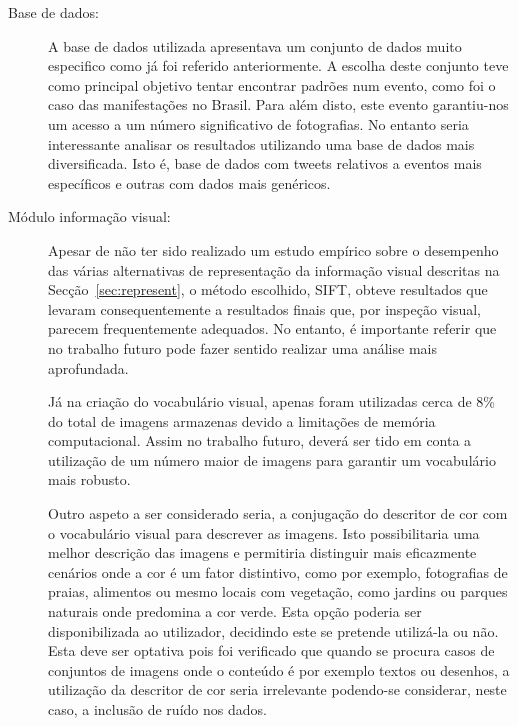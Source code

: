 \begin{description}
\item [Base de dados:] 
A base de dados utilizada apresentava um conjunto de dados muito especifico como já foi referido anteriormente. A escolha deste conjunto teve como principal objetivo tentar encontrar padrões num evento, como foi o caso das manifestações no Brasil. Para além disto, este evento garantiu-nos um acesso a um número significativo de fotografias. No entanto seria interessante analisar os resultados utilizando uma base de dados mais diversificada. Isto é, base de dados com tweets relativos a eventos mais específicos e outras com dados mais genéricos. %

\item [Módulo informação visual:]
Apesar de não ter sido realizado um estudo empírico sobre o desempenho das várias alternativas de representação da informação visual descritas na Secção~\ref{sec:represent}, o método escolhido, SIFT, obteve resultados que levaram consequentemente a resultados finais que, por inspeção visual, parecem frequentemente adequados. No entanto, é importante referir que no trabalho futuro pode fazer sentido realizar uma análise mais aprofundada.

Já na criação do vocabulário visual, apenas foram utilizadas cerca de 8\% do total de imagens armazenas devido a limitações de memória computacional. Assim no trabalho futuro, deverá ser tido em conta a utilização de um número maior de imagens para garantir um vocabulário mais robusto.


Outro aspeto a ser considerado seria, a conjugação do descritor de cor com o vocabulário visual para descrever as imagens. Isto possibilitaria uma melhor descrição das imagens e permitiria distinguir mais eficazmente cenários onde a cor é um fator distintivo, como por exemplo, fotografias de praias, alimentos ou mesmo locais com vegetação, como jardins ou parques naturais onde predomina a cor verde. Esta opção poderia ser disponibilizada ao utilizador, decidindo este se pretende utilizá-la ou não. Esta deve ser optativa pois foi verificado que quando se procura casos de conjuntos de imagens onde o conteúdo é por exemplo textos ou desenhos, a utilização da descritor de cor seria irrelevante podendo-se considerar, neste caso, a inclusão de ruído nos dados.


\end{description}

